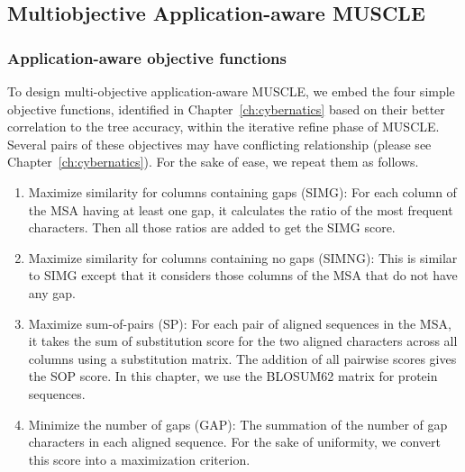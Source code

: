 

\subsection{Multiobjective Application-aware MUSCLE} \label{sec:ma-muscle}

\subsubsection{Application-aware objective functions}
To design multi-objective application-aware MUSCLE, we embed the four simple objective functions, identified in Chapter~\ref{ch:cybernatics} based on their better correlation to the tree accuracy, within the iterative refine phase of MUSCLE. Several pairs of these objectives may have conflicting relationship (please see Chapter~\ref{ch:cybernatics}). For the sake of ease, we repeat them as follows.
\begin{enumerate}
	\item Maximize similarity for columns containing gaps (SIMG): For each column of the MSA having at least one gap, it calculates the ratio of the most frequent characters. Then all those ratios are added to get the SIMG score.
	\item Maximize similarity for columns containing no gaps (SIMNG): This is similar to SIMG except that it considers those columns of the MSA that do not have any gap.
	\item Maximize sum-of-pairs (SP): For each pair of aligned sequences in the MSA, it takes the sum of substitution score for the two aligned characters across all columns using a substitution matrix. The addition of all pairwise scores gives the SOP score. In this chapter, we use the BLOSUM62 matrix for protein sequences.
	\item Minimize the number of gaps (GAP): The summation of the number of gap characters in each aligned sequence. For the sake of uniformity, we convert this score into a maximization criterion.
\end{enumerate}


